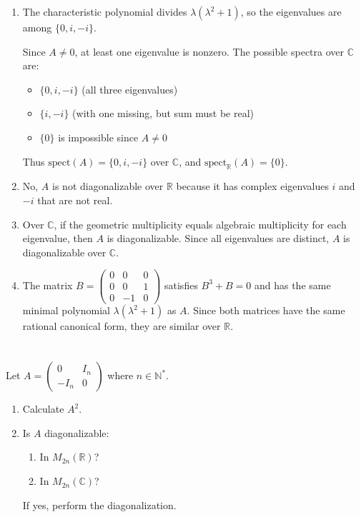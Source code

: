 \documentclass[12pt]{article}
\begin{document}
\begin{correctionbox}
\begin{enumerate}
    \item The characteristic polynomial divides $\lambda(\lambda^2 + 1)$, so the eigenvalues are among $\{0, i, -i\}$.

Since $A \ne 0$, at least one eigenvalue is nonzero. The possible spectra over $\mathbb{C}$ are:

\begin{itemize}
    \item $\{0, i, -i\}$ (all three eigenvalues)
    \item $\{i, -i\}$ (with one missing, but sum must be real)
    \item $\{0\}$ is impossible since $A \ne 0$
\end{itemize}

Thus $\text{spect}(A) = \{0, i, -i\}$ over $\mathbb{C}$, and $\text{spect}_{\mathbb{R}}(A) = \{0\}$.

\item No, $A$ is not diagonalizable over $\mathbb{R}$ because it has complex eigenvalues $i$ and $-i$ that are not real.

\item Over $\mathbb{C}$, if the geometric multiplicity equals algebraic multiplicity for each eigenvalue, then $A$ is diagonalizable. Since all eigenvalues are distinct, $A$ is diagonalizable over $\mathbb{C}$.

\item The matrix $B = \begin{pmatrix}0&0&0\\ 0&0&1\\ 0&-1&0\end{pmatrix}$ satisfies $B^3 + B = 0$ and has the same minimal polynomial $\lambda(\lambda^2 + 1)$ as $A$. Since both matrices have the same rational canonical form, they are similar over $\mathbb{R}$.
\end{enumerate}
\end{correctionbox}

\section{}
Let $A=\begin{pmatrix}0&I_{n}\\ -I_{n}&0\end{pmatrix}$ where $n \in \mathbb{N}^{*}$.
\begin{enumerate}
    \item Calculate $A^2$.
    \item Is $A$ diagonalizable:
    \begin{enumerate}
        \item In $M_{2n}(\mathbb{R})$?
        \item In $M_{2n}(\mathbb{C})$?
    \end{enumerate}
    If yes, perform the diagonalization.
\end{enumerate}
\end{document}
